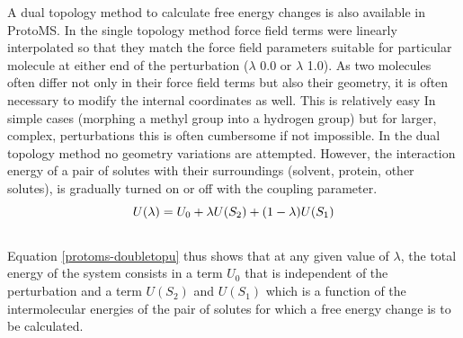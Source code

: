 \documentclass[letterpaper,10pt,english]{manual}
\begin{document}
A dual topology method to calculate free energy changes is also available in ProtoMS. In the single topology method force field terms were linearly interpolated so that they match the force field parameters suitable for particular molecule at either end of the perturbation ($\lambda$ 0.0 or $\lambda$ 1.0). As two molecules often differ not only in their force field terms but also their geometry, it is often necessary to modify the internal coordinates as well. This is relatively easy In simple cases (morphing a methyl group into a hydrogen group) but for larger, complex, perturbations this is often cumbersome if not impossible. In the dual topology method no geometry variations are attempted. However, the interaction energy of a pair of solutes with their surroundings (solvent, protein, other solutes), is gradually turned on or off with the coupling parameter.
\hypertarget{equation-doubletopu}{}\begin{gather}
\begin{split}U(\lambda) = U_{0} + \lambda U(S_{2}) + (1 - \lambda) U(S_{1})\end{split}\label{protoms-doubletopu}\\\begin{split}\end{split}\notag
\end{gather}
Equation \eqref{protoms-doubletopu} thus shows that at any given value of $\lambda$, the total energy of the system consists in a term $U_{0}$ that is independent of the perturbation and a term $U(S_{2})$ and $U(S_{1})$ which is a function of the intermolecular energies of the pair of solutes for which a free energy change is to be calculated.
\end{document}
